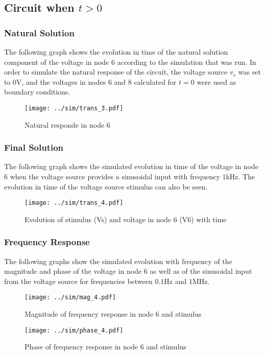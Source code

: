 \subsection{Circuit when $t>0$}

\subsubsection{Natural Solution}

The following graph shows the evolution in time of the natural solution component of the voltage in node 6 according to the simulation that was run. In order to simulate the natural response of the circuit, the voltage source $v_s$ was set to $0$V, and the voltages in nodes 6 and 8 calculated for $t=0$ were used as boundary conditions.

\begin{figure}[h] \centering
\texttt{[image: ../sim/trans\_3.pdf]}
\caption{Natural responde in node 6}
\label{fig:natural_sim}
\end{figure}

\subsubsection{Final Solution}

The following graph shows the simulated evolution in time of the voltage in node 6 when the voltage source provides a sinusoidal input with frequency $1$kHz. The evolution in time of the voltage source stimulus can also be seen.

\begin{figure}[h] \centering
\texttt{[image: ../sim/trans\_4.pdf]}
\caption{Evolution of stimulus (Vs) and voltage in node 6 (V6) with time}
\label{fig:final_sim}
\end{figure}

\lipsum[1-1]

\subsubsection{Frequency Response}

The following graphs show the simulated evolution with frequency of the magnitude and phase of the voltage in node 6 as well as of the sinusoidal input from the voltage source for frequencies between $0.1$Hz and $1$MHz.

\begin{figure}[h] \centering
\texttt{[image: ../sim/mag\_4.pdf]}
\caption{Magnitude of frequency response in node 6 and stimulus}
\label{fig:mag_sim}
\end{figure}


\begin{figure}[h] \centering
\texttt{[image: ../sim/phase\_4.pdf]}
\caption{Phase of frequency response in node 6 and stimulus}
\label{fig:phase_sim}
\end{figure}
